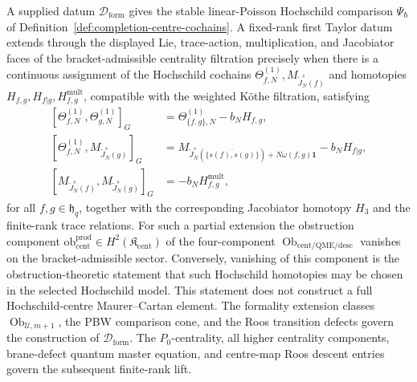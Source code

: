 \begin{thm}
\label{thm:completion-centrality-homotopies}
A supplied datum \(\mathcal D_{\mathrm{form}}\) gives the stable
linear-Poisson Hochschild comparison \(\Psi_\hbar\) of
Definition~\ref{def:completion-centre-cochains}.  A fixed-rank
first Taylor datum extends through the displayed Lie, trace-action,
multiplication, and Jacobiator faces of the bracket-admissible
centrality filtration precisely when there is a continuous assignment
of the Hochschild cochains
\(\Theta^{(1)}_{f,N},M_{\widetilde J_N^s(f)}\) and homotopies
\(H_{f,g},H_{f|g},H^{\mathrm{mult}}_{f,g}\), compatible with the
weighted K\"othe filtration, satisfying
\[
  \begin{aligned}
    [\Theta^{(1)}_{f,N},\Theta^{(1)}_{g,N}]_G
      &=\Theta^{(1)}_{\{f,g\},N}-b_NH_{f,g},\\
    [\Theta^{(1)}_{f,N},M_{\widetilde J_N^s(g)}]_G
      &=M_{\widetilde J_N^s(\overline{\{s(f),s(g)\}})
              +N\omega(f,g)\mathbf1}
        -b_NH_{f|g},\\
    [M_{\widetilde J_N^s(f)},M_{\widetilde J_N^s(g)}]_G
      &=-b_NH^{\mathrm{mult}}_{f,g},
  \end{aligned}
\]
for all \(f,g\in\mathfrak h_q\), together with the corresponding
Jacobiator homotopy \(H_3\) and the finite-rank trace relations.
For such a partial extension the obstruction component
\(\mathrm{ob}^{\mathrm{prod}}_{\mathrm{cent}}\in
H^2(\mathfrak K_{\mathrm{cent}})\) of the four-component
\(\operatorname{Ob}_{\mathrm{cent/QME/desc}}\) vanishes on the
bracket-admissible sector.  Conversely, vanishing of this component is
the obstruction-theoretic statement that such Hochschild homotopies may
be chosen in the selected Hochschild model.
This statement does not construct a full Hochschild-centre
Maurer--Cartan element.  The formality extension classes
\(\operatorname{Ob}_{\mathcal U,m+1}\), the PBW comparison cone,
and the Roos transition defects govern the construction of
\(\mathcal D_{\mathrm{form}}\).  The \(P_0\)-centrality, all higher
centrality components, brane-defect quantum master equation, and
centre-map Roos descent entries govern the subsequent finite-rank
lift.
\end{thm}

